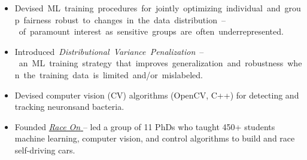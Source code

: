\documentclass[11pt]{article}
\makeatletter
\newcommand{\hl}[1]{%
    \setbox\@tempboxa\hbox{#1}%
    \ifdim\wd\@tempboxa>\linewidth
    \noindent
    \fcolorbox{black}{white}{%
        \parbox[m]{\dimexpr\linewidth-2\fboxsep}{{\large \onehalfspacing #1}}
          
    }%
    \else
    \fcolorbox{black}{white}{#1}%
    \fi
}%
\newcommand{\checkthis}{{\small \faIcon{star}}}
\makeatother
\begin{document}
\begin{rightrule}
\begin{itemize}[left=5pt]
    \item[\checkthis] \hl{Devised ML training procedures for jointly optimizing individual and group fairness robust to changes in the data distribution -- of paramount interest as sensitive groups are often underrepresented.\footnotemark[1]}

    \item[\checkthis] \hl{Introduced \textit{Distributional Variance Penalization} -- an ML training strategy that improves generalization and robustness when the training data is limited and/or mislabeled.\footnotemark[2]}
    
    \item Devised computer vision (CV) algorithms (OpenCV, C++) for detecting and tracking neurons\footnotemark[3] and bacteria.\footnotemark[4]
    
    \item Founded \href{http://raceon.io/}{\textit{Race On} \scriptsize {}} -- led a group of 11 PhDs who taught 450+ students machine learning, computer vision, and control algorithms to build and race self-driving cars. 
    

\end{itemize}
\end{rightrule}
\end{document}
